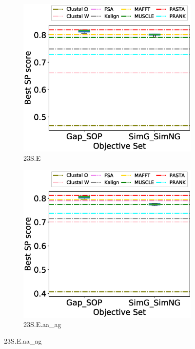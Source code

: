 \begin{figure}[!htbp]
\begin{adjustwidth}{-0.5cm}{-0.5cm}
\begin{subfigure}{0.25\textwidth}
			\includegraphics[width=\columnwidth]{Figure/summary/precomputedInit/23S.E/objset_pairs_rank}
			\caption{23S.E}
		\end{subfigure}    
		\begin{subfigure}{0.25\textwidth}
			\includegraphics[width=\columnwidth]{Figure/summary/precomputedInit/23S.E.aa_ag/objset_pairs_rank}
			\caption{23S.E.aa\_ag}
		\end{subfigure}

\end{adjustwidth}
\end{figure}
